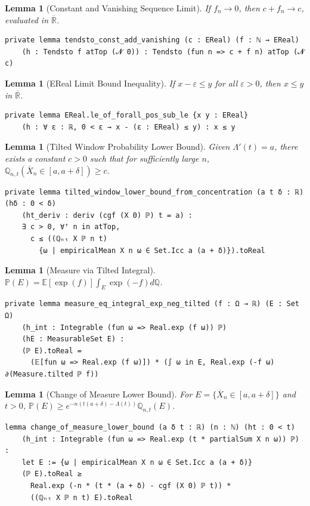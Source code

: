 \documentclass{article}
\newtheorem{lemma}[theorem]{Lemma}
\newcommand{\E}{\mathbb{E}}
\renewcommand{\P}{\mathbb{P}}
\newcommand{\Q}{\mathbb{Q}}
\newcommand{\R}{\mathbb{R}}
\begin{document}
\begin{lemma}[Constant and Vanishing Sequence Limit]
  If $f_n \to 0$, then $c + f_n \to c$, evaluated in $\overline{\R}$.
\end{lemma}
\begin{lstlisting}
private lemma tendsto_const_add_vanishing (c : EReal) (f : ℕ → EReal)
    (h : Tendsto f atTop (𝓝 0)) : Tendsto (fun n => c + f n) atTop (𝓝 c)
\end{lstlisting}
\begin{lemma}[EReal Limit Bound Inequality]
  If $x - \varepsilon \le y$ for all $\varepsilon > 0$, then $x \le y$ in $\overline{\R}$.
\end{lemma}
\begin{lstlisting}
private lemma EReal.le_of_forall_pos_sub_le {x y : EReal}
    (h : ∀ ε : ℝ, 0 < ε → x - (ε : EReal) ≤ y) : x ≤ y
\end{lstlisting}
\begin{lemma}[Tilted Window Probability Lower Bound]
  Given $\Lambda'(t) = a$, there exists a constant $c > 0$ such that for sufficiently large $n$, $\Q_{n,t}(\overline{X}_n \in [a, a+\delta]) \ge c$.
\end{lemma}
\begin{lstlisting}
private lemma tilted_window_lower_bound_from_concentration (a t δ : ℝ) (hδ : 0 < δ)
    (ht_deriv : deriv (cgf (X 0) ℙ) t = a) :
    ∃ c > 0, ∀ᶠ n in atTop,
      c ≤ ((ℚₙₜ X ℙ n t)
        {ω | empiricalMean X n ω ∈ Set.Icc a (a + δ)}).toReal
\end{lstlisting}
\begin{lemma}[Measure via Tilted Integral]
  $\P(E) = \E[\exp(f)] \int_E \exp(-f) d\Q$.
\end{lemma}
\begin{lstlisting}
private lemma measure_eq_integral_exp_neg_tilted (f : Ω → ℝ) (E : Set Ω)
    (h_int : Integrable (fun ω => Real.exp (f ω)) ℙ)
    (hE : MeasurableSet E) :
    (ℙ E).toReal =
      (𝔼[fun ω => Real.exp (f ω)]) * (∫ ω in E, Real.exp (-f ω) ∂(Measure.tilted ℙ f))
\end{lstlisting}
\begin{lemma}[Change of Measure Lower Bound]
  For $E = \{\overline{X}_n \in [a, a+\delta]\}$ and $t > 0$, $\P(E) \ge e^{-n(t(a+\delta) - \Lambda(t))} \Q_{n,t}(E)$.
\end{lemma}
\begin{lstlisting}[caption={LargeDeviations/Cramers/LowerBound.lean}]
lemma change_of_measure_lower_bound (a δ t : ℝ) (n : ℕ) (ht : 0 < t)
    (h_int : Integrable (fun ω => Real.exp (t * partialSum X n ω)) ℙ) :
    let E := {ω | empiricalMean X n ω ∈ Set.Icc a (a + δ)}
    (ℙ E).toReal ≥
      Real.exp (-n * (t * (a + δ) - cgf (X 0) ℙ t)) *
      ((ℚₙₜ X ℙ n t) E).toReal
\end{lstlisting}
\end{document}
